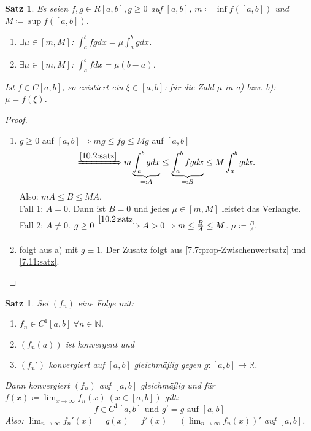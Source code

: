 \documentclass[12pt]{extreport} %
\newcommand{\N}{\mathbb{N}}
\newcommand{\R}{\mathbb{R}}
\theoremstyle{named}
\theoremstyle{dotless}
\newtheorem{satz}[unnamedtheorem]{Satz}
\begin{document}
\begin{satz} \label{10.16:satz-Mittelwertsätze}
	Es seien $f, g \in R[a, b], g \geq 0$ auf $[a, b]$, $m \coloneqq \inf f([a, b])$ und $M \coloneqq \sup f([a, b])$.
	\begin{enumerate}
		\item $\exists \mu \in [m, M]$: $\int_{a}^{b} fg dx = \mu \int_{a}^{b} g dx$.
		\item $\exists \mu \in [m, M]$: $\int_{a}^{b} f dx = \mu (b - a)$.
	\end{enumerate}
	Ist $f \in C[a, b]$, so existiert ein $\xi \in [a, b]$: für die Zahl $\mu$ in a) bzw. b): $\mu = f(\xi)$.
\end{satz}

\begin{proof} ~\
	\begin{enumerate}
		\item $g \geq 0$ auf $[a, b] \Rightarrow mg \leq fg \leq Mg$ auf $[a, b]$
			$$ \xRightarrow[]{\ref{10.2:satz}} m \underbrace{\int_{a}^{b} g dx}_{\eqqcolon A} \leq \underbrace{\int_{a}^{b} fg dx}_{\eqqcolon B} \leq M \int_{a}^{b} g dx. $$
			Also: $m A \leq B \leq M A$. \\
			Fall 1: $A = 0$. Dann ist $B = 0$ und jedes $\mu \in [m, M]$ leistet das Verlangte. \\
			Fall 2: $A \neq 0$. $g \geq 0 \xRightarrow[]{\ref{10.2:satz}} A > 0 \Rightarrow m \leq \frac{B}{A} \leq M$. $\mu \coloneqq \frac{B}{A}$.
		\item folgt aus a) mit $g \equiv 1$. Der Zusatz folgt aus \ref{7.7:prop-Zwischenwertsatz} und \ref{7.11:satz}.
	\end{enumerate}
\end{proof}


\begin{satz} \label{10.17:satz}
	Sei $(f_{n})$ eine Folge mit:
	\begin{enumerate}[label=\roman*\upshape)]
		\item $f_{n} \in C^{1}[a, b] ~\forall n \in \N$,
		\item $(f_{n}(a))$ ist konvergent und
		\item $(f_{n}')$ konvergiert auf $[a, b]$ gleichmä{\ss}ig gegen $g \colon [a, b] \rightarrow \R$.
	\end{enumerate}
	Dann konvergiert $(f_{n})$ auf $[a, b]$ gleichmä{\ss}ig und für $f(x) \coloneqq \lim_{x \rightarrow \infty} f_{n}(x) ~(x \in [a, b])$ gilt:
		$$ f \in C^{1}[a, b] \text{ und } g' = g \text{ auf } [a, b] $$
	Also: $\lim_{n \rightarrow \infty} f_{n}'(x) = g(x) = f'(x) = (\lim_{n \rightarrow \infty} f_{n}(x))'$ auf $[a, b]$.
\end{satz}
\end{document}
